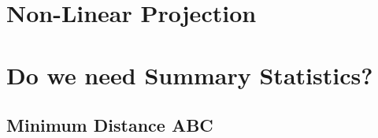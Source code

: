 \documentclass[11pt,a4paper]{article}
\begin{document}
\section*{Non-Linear Projection}

\section*{Do we need Summary Statistics?}

\subsection*{Minimum Distance ABC}
\end{document}
